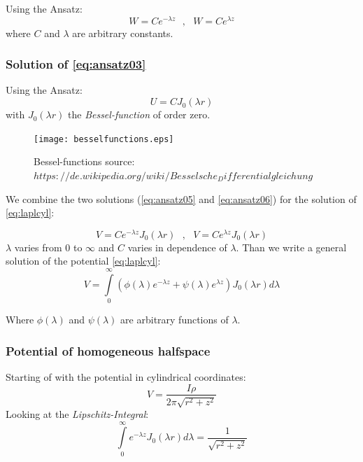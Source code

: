 Using the Ansatz:
\begin{equation}
W=Ce^{-\lambda z}~~~,~~~ W=Ce^{\lambda z} \label{eq:ansatz05}
\end{equation}
where $C$ and $\lambda$ are arbitrary constants.
\subsubsection*{Solution of \eqref{eq:ansatz03}}

Using the Ansatz:
\begin{equation}
U=C J_0(\lambda r) \label{eq:ansatz06}
\end{equation}
with $J_0(\lambda r)$ the \textit{Bessel-function} of order zero.

\begin{figure}[h!]
\begin{center}
\texttt{[image: besselfunctions.eps]}
\caption{Bessel-functions source: $ https://de.wikipedia.org/wiki/Besselsche_Differentialgleichung$}
\label{fig:besself}
\end{center}
\end{figure}

We combine the two solutions (\eqref{eq:ansatz05} and \eqref{eq:ansatz06}) for the solution of \eqref{eq:laplcyl}:

\begin{equation}
V=Ce^{-\lambda z}J_0(\lambda r) ~~~,~~~ V=Ce^{\lambda z}J_0(\lambda r) \label{eq:ansatz07}
\end{equation}
$\lambda$ varies from $0$ to $\infty$ and $C$ varies in dependence of $\lambda$. Than we write a general solution of the potential \eqref{eq:laplcyl}:
\begin{equation}
V=\int\limits_{0}^{\infty}\left(\phi(\lambda)e^{-\lambda z}+\psi(\lambda)e^{\lambda z}\right)J_0(\lambda r) d\lambda \label{eq:sol-lapleq}
\end{equation}

Where $\phi(\lambda)$ and $\psi(\lambda)$ are arbitrary functions of $\lambda$.

\subsubsection*{Potential of homogeneous halfspace}
Starting of with the potential in cylindrical coordinates:
\begin{equation}
V=\frac{I\rho}{2\pi\sqrt{r^2+z^2}}\label{eq:2-20}
\end{equation}
Looking at the \textit{Lipschitz-Integral}:
\begin{equation}
\int\limits_{0}^{\infty}e^{-\lambda z}J_0(\lambda r)d\lambda=\frac{1}{\sqrt{r^2+z^2}} \label{eq:lipschitzint}
\end{equation}

